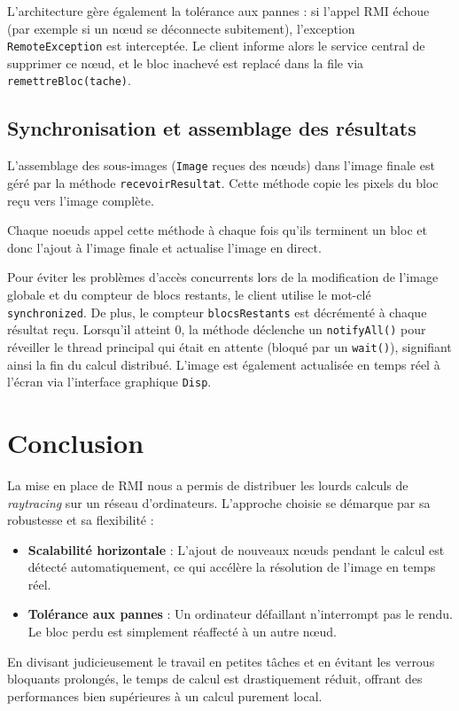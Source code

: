 \documentclass[a4paper,11pt]{article}
\begin{document}
L'architecture gère également la tolérance aux pannes : si l'appel RMI échoue (par exemple si un nœud se déconnecte subitement), l'exception \texttt{RemoteException} est interceptée. Le client informe alors le service central de supprimer ce nœud, et le bloc inachevé est replacé dans la file via \texttt{remettreBloc(tache)}.

\subsection{Synchronisation et assemblage des résultats}

L'assemblage des sous-images (\texttt{Image} reçues des nœuds) dans l'image finale est géré par la méthode \texttt{recevoirResultat}. Cette méthode copie les pixels du bloc reçu vers l'image complète. 

Chaque noeuds appel cette méthode à chaque fois qu'ils terminent un bloc et donc l'ajout à l'image finale et actualise l'image en direct.

Pour éviter les problèmes d'accès concurrents lors de la modification de l'image globale et du compteur de blocs restants, le client utilise le mot-clé \texttt{synchronized}. De plus, le compteur \texttt{blocsRestants} est décrémenté à chaque résultat reçu. Lorsqu'il atteint 0, la méthode déclenche un \texttt{notifyAll()} pour réveiller le thread principal qui était en attente (bloqué par un \texttt{wait()}), signifiant ainsi la fin du calcul distribué. L'image est également actualisée en temps réel à l'écran via l'interface graphique \texttt{Disp}.

\newpage

\section{Conclusion}

La mise en place de RMI nous a permis de distribuer les lourds calculs de \textit{raytracing} sur un réseau d'ordinateurs. L'approche choisie se démarque par sa robustesse et sa flexibilité :
\begin{itemize}
    \item \textbf{Scalabilité horizontale} : L'ajout de nouveaux nœuds pendant le calcul est détecté automatiquement, ce qui accélère la résolution de l'image en temps réel.
    \item \textbf{Tolérance aux pannes} : Un ordinateur défaillant n'interrompt pas le rendu. Le bloc perdu est simplement réaffecté à un autre nœud.
\end{itemize}
En divisant judicieusement le travail en petites tâches et en évitant les verrous bloquants prolongés, le temps de calcul est drastiquement réduit, offrant des performances bien supérieures à un calcul purement local.
\end{document}
